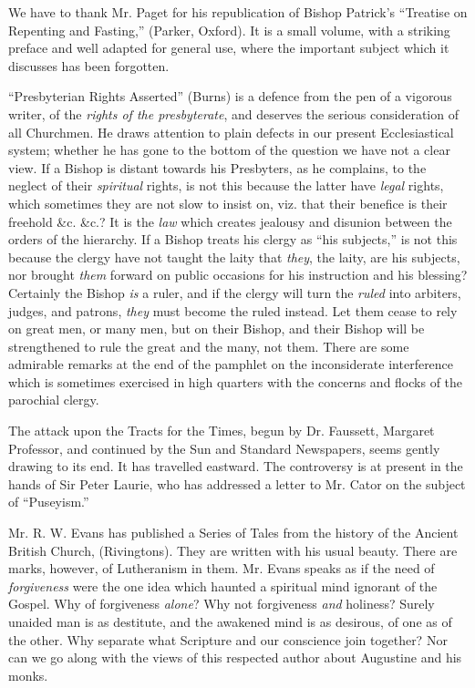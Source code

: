 We have to thank Mr. Paget for his republication of
Bishop Patrick's ``Treatise on Repenting and Fasting,'' (Parker, Oxford).
It is a small volume, with a striking preface and well adapted for
general use, where the important subject which it discusses has been
forgotten.

``Presbyterian Rights Asserted'' (Burns) is a defence
from the pen of a vigorous writer, of the \emph{rights of the presbyterate},
and deserves the serious consideration of all Churchmen. He draws
attention to plain defects in our present Ecclesiastical system; whether
he has gone to the bottom of the question we have not a clear view. If a
Bishop is distant towards his Presbyters, as he complains, to the
neglect of their \emph{spiritual} rights, is not this because the latter
have \emph{legal} rights, which sometimes they are not slow to insist
on, viz. that their benefice is their freehold \&c. \&c.? It is
the \emph{law} which creates jealousy and disunion between the orders of
the hierarchy. If a Bishop treats his clergy as ``his subjects,'' is not
this because the clergy have not taught the laity that \emph{they}, the
laity, are his subjects, nor brought \emph{them} forward on public
occasions for his instruction and his blessing? Certainly the Bishop \emph{is}
a ruler, and if the clergy will turn the \emph{ruled} into arbiters,
judges, and patrons, \emph{they} must become the ruled instead.
Let them cease to rely on great men, or many men, but on their Bishop,
and their Bishop will be strengthened to rule the great and the many,
not them. There are some admirable remarks at the end of the pamphlet on
the inconsiderate interference which is sometimes exercised in high
quarters with the concerns and flocks of the parochial clergy.

The attack upon the Tracts for the Times, begun by
Dr. Faussett, Margaret Professor, and continued by the Sun and Standard
Newspapers, seems gently drawing to its end. It has travelled eastward.
The controversy is at present in the hands of Sir Peter Laurie, who has
addressed a letter to Mr. Cator on the subject of ``Puseyism.''

Mr. R. W. Evans has published a Series of Tales
from the history of the Ancient British Church, (Rivingtons). They are
written with his usual beauty. There are marks, however, of Lutheranism
in them. Mr. Evans speaks as if the need of \emph{forgiveness} were the
one idea which haunted a spiritual mind ignorant of the Gospel. Why of
forgiveness \emph{alone}? Why not forgiveness \emph{and} holiness?
Surely unaided man is as destitute, and the awakened mind is as
desirous, of one as of the other. Why separate what Scripture and our
conscience join together? Nor can we go along with the views of this
respected author about Augustine and his monks.


